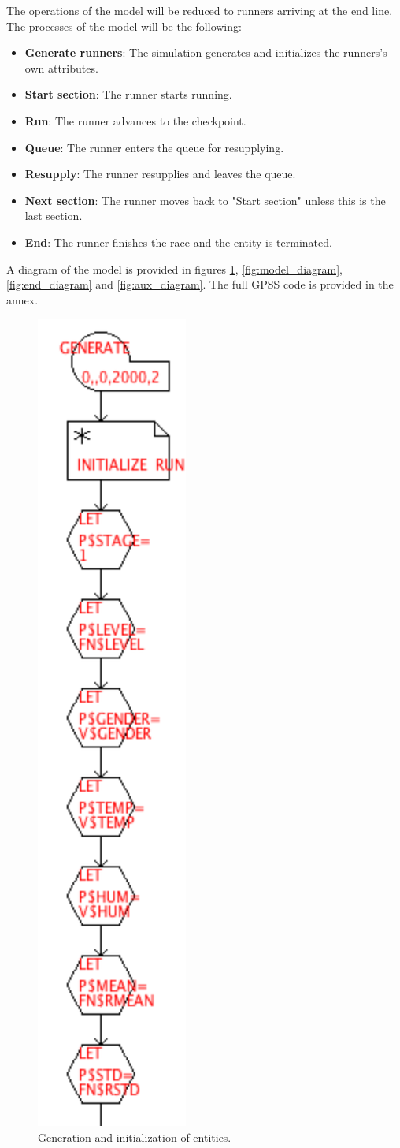 \documentclass[conference]{IEEEtran}
\begin{document}
The operations of the model will be reduced to runners arriving at the end line. The processes of the model will be the following:
\begin{itemize}
    \item \textbf{Generate runners}: The simulation generates and initializes the runners's own attributes.
    \item \textbf{Start section}: The runner starts running.
    \item \textbf{Run}: The runner advances to the checkpoint.
    \item \textbf{Queue}: The runner enters the queue for resupplying.
    \item \textbf{Resupply}: The runner resupplies and leaves the queue.
    \item \textbf{Next section}: The runner moves back to "Start section" unless this is the last section.
    \item \textbf{End}: The runner finishes the race and the entity is terminated.
\end{itemize}

A diagram of the model is provided in figures \ref{fig:init_diagram}, \ref{fig:model_diagram}, \ref{fig:end_diagram} and \ref{fig:aux_diagram}. The full GPSS code is provided in the annex.

\begin{figure}[]
    \centerline{\includegraphics[width=0.2\linewidth]{figs/init_diag.png}}
    \caption{Generation and initialization of entities.}
    \label{fig:init_diagram}
\end{figure}
\end{document}

